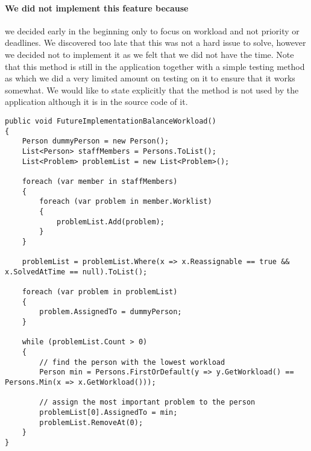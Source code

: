 \paragraph{We did not implement this feature because} we decided early in the beginning only to focus on workload and not priority or deadlines. We discovered too late that this was not a hard issue to solve, however we decided not to implement it as we felt that we did not have the time. Note that this method is still in the application together with a simple testing method as which we did a very limited amount on testing on it to ensure that it works somewhat. We would like to state explicitly that the  method is not used by the application although it is in the source code of it.

\begin{lstlisting}[style=sourceCode, caption=\myCaption{A possible future implementation of the \me{BalanceWorkload} algorithm.}, label=lst:futureimplementationbalanceworkload]
public void FutureImplementationBalanceWorkload()
{
    Person dummyPerson = new Person();
    List<Person> staffMembers = Persons.ToList();
    List<Problem> problemList = new List<Problem>();

    foreach (var member in staffMembers)
    {
        foreach (var problem in member.Worklist)
        {
            problemList.Add(problem);
        }
    }

    problemList = problemList.Where(x => x.Reassignable == true && x.SolvedAtTime == null).ToList();

    foreach (var problem in problemList)
    {
        problem.AssignedTo = dummyPerson;
    }

    while (problemList.Count > 0)
    {
        // find the person with the lowest workload
        Person min = Persons.FirstOrDefault(y => y.GetWorkload() == Persons.Min(x => x.GetWorkload()));

        // assign the most important problem to the person
        problemList[0].AssignedTo = min;
        problemList.RemoveAt(0);
    }
}
\end{lstlisting}


